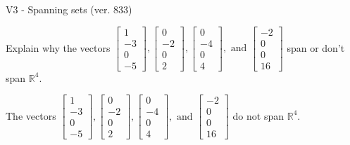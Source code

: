 \begin{exercise}
  \begin{exerciseTitle}V3 - Spanning sets (ver. 833)\end{exerciseTitle}
  \begin{exerciseStatement}
    Explain why the vectors \(\left[\begin{array}{r}
1 \\
-3 \\
0 \\
-5
\end{array}\right] , \left[\begin{array}{r}
0 \\
-2 \\
0 \\
2
\end{array}\right] , \left[\begin{array}{r}
0 \\
-4 \\
0 \\
4
\end{array}\right] , \text{ and } \left[\begin{array}{r}
-2 \\
0 \\
0 \\
16
\end{array}\right]\) span or don't span \(\mathbb{R}^4\). 
	


  \end{exerciseStatement}
  \begin{exerciseAnswer}
   The vectors \(\left[\begin{array}{r}
1 \\
-3 \\
0 \\
-5
\end{array}\right] , \left[\begin{array}{r}
0 \\
-2 \\
0 \\
2
\end{array}\right] , \left[\begin{array}{r}
0 \\
-4 \\
0 \\
4
\end{array}\right] , \text{ and } \left[\begin{array}{r}
-2 \\
0 \\
0 \\
16
\end{array}\right]\) 
  	 do not  
	span \(\mathbb{R}^4\).
  


  \end{exerciseAnswer}
\end{exercise}